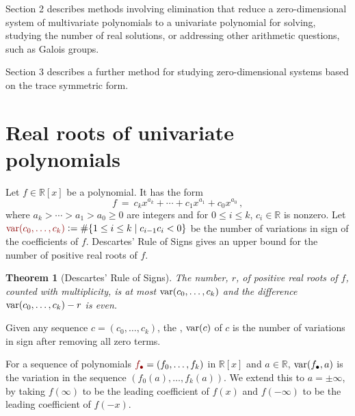 \documentclass[12pt]{amsart}
\newtheorem{theorem}{Theorem}
\theoremstyle{definition}
\newcommand{\RR}{\mathbb{R}}
\DeclareMathOperator{\var}{{\rm var}}
\newcommand{\defcolor}[1]{{\color{TAMU}#1}}
\newcommand{\demph}[1]{\defcolor{{\sl #1}}}
\begin{document}
Section 2 describes methods involving elimination that reduce a zero-dimensional system of multivariate polynomials to a univariate
polynomial for solving, studying the number of real solutions, or addressing other arithmetic questions, such as Galois groups.

Section 3 describes a further method for studying zero-dimensional systems based on the trace symmetric form.


\section{Real roots of univariate polynomials}\label{S:one}

Let $f\in\RR[x]$ be a polynomial.
It has the form
%
 \[
   f\ =\ c_kx^{a_k}  + \dotsb + c_{1}x^{a_{1}} + c_0x^{a_0}\,,
 \]
%
where $a_k> \dotsb > a_1 > a_0 \geq 0$ are integers and for $0\leq i \leq k$, $c_{i}\in\RR$ is nonzero.
Let $\defcolor{\var(c_0,\dotsc,c_k)}\vcentcolon=\#\{1\leq i\leq k\mid c_{i-1}c_i<0\}$ be the number of variations in sign of the
coefficients of $f$.
Descartes' Rule of Signs \cite{So_Book} gives an upper bound for the number of positive real roots of $f$.

\begin{theorem}[Descartes' Rule of Signs]
  The number, $r$,  of positive real roots of $f$, counted with multiplicity, is at most $\var(c_0,\dotsc,c_k)$ and the difference
  $\var(c_0,\dotsc,c_k)-r$ is even.
\end{theorem}

Given any sequence $c=(c_0,\dotsc,c_k)$, the \demph{variation},  \defcolor{$\var(c)$} of $c$ is the
number of variations in sign after removing all zero terms.
%
\begin{leftbar}

\end{leftbar}
%
For a sequence of polynomials  $\defcolor{f_\bullet}=(f_0,\dotsc,f_k)$ in $\RR[x]$ and $a\in\RR$, \defcolor{$\var(f_\bullet,a)$} is the
variation in the sequence 
$(f_0(a),\dotsc,f_{k}(a))$. 
We extend this to $a=\pm\infty$, by taking $f(\infty)$ to be the leading coefficient of $f(x)$ and $f(-\infty)$ to be the leading
coefficient of $f(-x)$.
\end{document}
